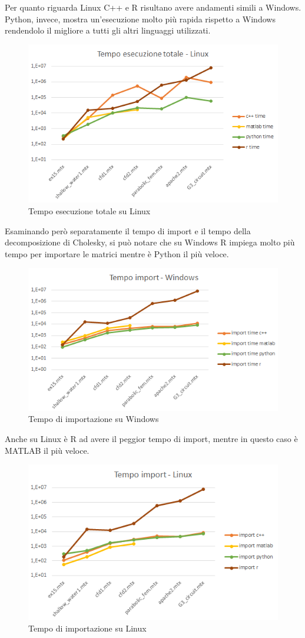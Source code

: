 \documentclass[a4paper,12pt]{article}
\begin{document}
\noindent Per quanto riguarda Linux C++ e R risultano avere andamenti simili a Windows. Python, invece, mostra un'esecuzione molto più rapida rispetto a Windows rendendolo il migliore a tutti gli altri linguaggi utilizzati.

\begin{figure}[H]
\centering
  \includegraphics[width=0.8\linewidth]{img/tempototlinux.png}
\caption{Tempo esecuzione totale su Linux}
\end{figure}

\fancyhf{}
\rhead{\leftmark}
\fancyfoot[C]{\thepage}

\noindent Esaminando però separatamente il tempo di import e il tempo della decomposizione di Cholesky, si può notare che su Windows R impiega molto più tempo per importare le matrici mentre è Python il più veloce.

\begin{figure}[H]
\centering
  \includegraphics[width=0.8\linewidth]{img/tempoimpwin.png}
\caption{Tempo di importazione su Windows}
\end{figure}

\noindent Anche su Linux è R ad avere il peggior tempo di import, mentre in questo caso è MATLAB il più veloce.
\begin{figure}[H]
\centering
  \includegraphics[width=0.7\linewidth]{img/tempoimplinux.png}
\caption{Tempo di importazione su Linux}
\end{figure}
\end{document}
